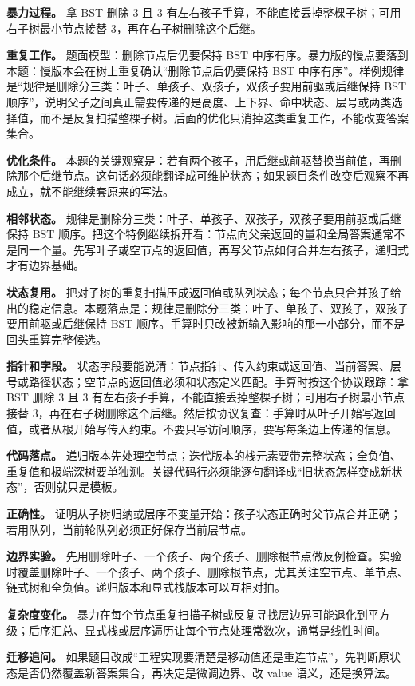 \textbf{暴力过程。} 拿 BST 删除 3 且 3 有左右孩子手算，不能直接丢掉整棵子树；可用右子树最小节点接替 3，再在右子树删除这个后继。

\textbf{重复工作。} 题面模型：删除节点后仍要保持 BST 中序有序。暴力版的慢点要落到本题：慢版本会在树上重复确认“删除节点后仍要保持 BST 中序有序”。样例规律是“规律是删除分三类：叶子、单孩子、双孩子，双孩子要用前驱或后继保持 BST 顺序”，说明父子之间真正需要传递的是高度、上下界、命中状态、层号或两类选择值，而不是反复扫描整棵子树。后面的优化只消掉这类重复工作，不能改变答案集合。

\textbf{优化条件。} 本题的关键观察是：若有两个孩子，用后继或前驱替换当前值，再删除那个后继节点。这句话必须能翻译成可维护状态；如果题目条件改变后观察不再成立，就不能继续套原来的写法。

\textbf{相邻状态。} 规律是删除分三类：叶子、单孩子、双孩子，双孩子要用前驱或后继保持 BST 顺序。把这个特例继续拆开看：节点向父亲返回的量和全局答案通常不是同一个量。先写叶子或空节点的返回值，再写父节点如何合并左右孩子，递归式才有边界基础。

\textbf{状态复用。} 把对子树的重复扫描压成返回值或队列状态；每个节点只合并孩子给出的稳定信息。本题落点是：规律是删除分三类：叶子、单孩子、双孩子，双孩子要用前驱或后继保持 BST 顺序。手算时只改被新输入影响的那一小部分，而不是回头重算完整候选。

\textbf{指针和字段。} 状态字段要能说清：节点指针、传入约束或返回值、当前答案、层号或路径状态；空节点的返回值必须和状态定义匹配。手算时按这个协议跟踪：拿 BST 删除 3 且 3 有左右孩子手算，不能直接丢掉整棵子树；可用右子树最小节点接替 3，再在右子树删除这个后继。然后按协议复查：手算时从叶子开始写返回值，或者从根开始写传入约束。不要只写访问顺序，要写每条边上传递的信息。

\textbf{代码落点。} 递归版本先处理空节点；迭代版本的栈元素要带完整状态；全负值、重复值和极端深树要单独测。关键代码行必须能逐句翻译成“旧状态怎样变成新状态”，否则就只是模板。

\textbf{正确性。} 证明从子树归纳或层序不变量开始：孩子状态正确时父节点合并正确；若用队列，当前轮队列必须正好保存当前层节点。

\textbf{边界实验。} 先用删除叶子、一个孩子、两个孩子、删除根节点做反例检查。实验时覆盖删除叶子、一个孩子、两个孩子、删除根节点，尤其关注空节点、单节点、链式树和全负值。递归版本和显式栈版本可以互相对拍。

\textbf{复杂度变化。} 暴力在每个节点重复扫描子树或反复寻找层边界可能退化到平方级；后序汇总、显式栈或层序遍历让每个节点处理常数次，通常是线性时间。

\textbf{迁移追问。} 如果题目改成“工程实现要清楚是移动值还是重连节点”，先判断原状态是否仍然覆盖新答案集合，再决定是微调边界、改 value 语义，还是换算法。

